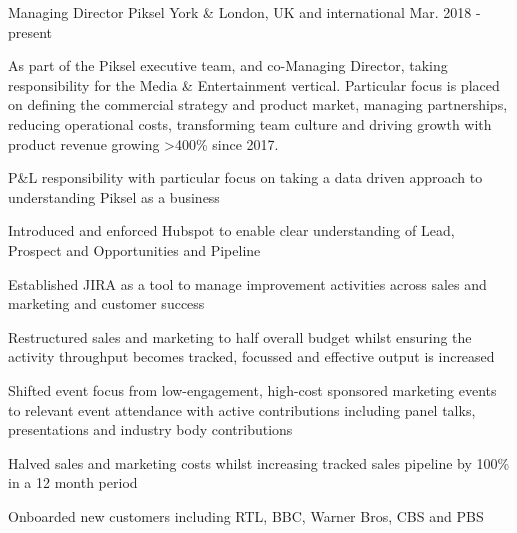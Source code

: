 


\begin{cventries}


\cvexpentry
{Managing Director} %
{Piksel} %
{York \& London, UK and international} %
{Mar. 2018 - present} %
{
\begin{cvitemstitle}
\item {As part of the Piksel executive team, and co-Managing Director, taking responsibility for the Media \& Entertainment vertical. Particular focus is placed on defining the commercial strategy and product market, managing partnerships, reducing operational costs, transforming team culture and driving growth with product revenue growing >400\% since 2017.}
\end{cvitemstitle}
}
{ %
\begin{cvitems}
\item {P\&L responsibility with particular focus on taking a data driven approach to understanding Piksel as a business}
\item {Introduced and enforced Hubspot to enable clear understanding of Lead, Prospect and Opportunities and Pipeline}
\item {Established JIRA as a tool to manage improvement activities across sales and marketing and customer success}
\item {Restructured sales and marketing to half overall budget whilst ensuring the activity throughput becomes tracked, focussed and effective output is increased}
\item {Shifted event focus from low-engagement, high-cost sponsored marketing events to relevant event attendance with active contributions including panel talks, presentations and industry body contributions}
\item {Halved sales and marketing costs whilst increasing tracked sales pipeline by 100\% in a 12 month period}
\item {Onboarded new customers including RTL, BBC, Warner Bros, CBS and PBS}
\end{cvitems}
}


\end{cventries}
